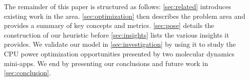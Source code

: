 The remainder of this paper is structured as follows: \autoref{sec:related} introduces existing work in the area. 
\autoref{sec:optimization} then describes the problem area and provides a summary of key concepts and metrics.
\autoref{sec:pose} details the construction of our heuristic before \autoref{sec:insights} lists the various insights it provides.
We validate our model in \autoref{sec:investigation} by using it to study the CPU power optimization opportunities presented by two molecular dynamics mini-apps. 
We end by presenting our conclusions and future work in \autoref{sec:conclusion}.
